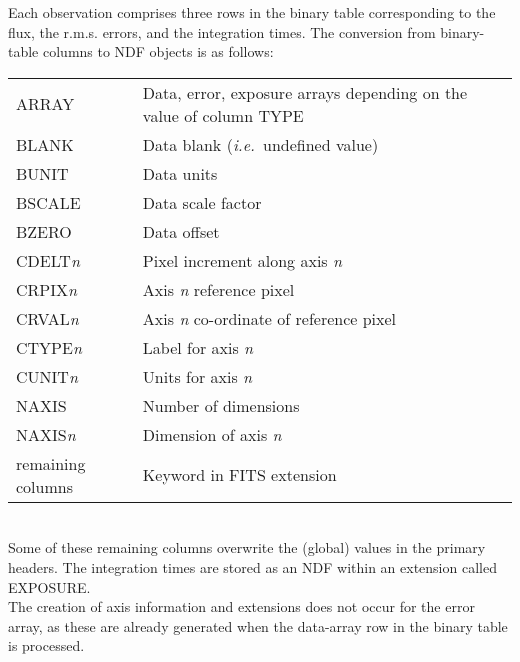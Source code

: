 \documentclass[twoside,11pt]{starlink}
\begin{document}
{{{{            Each observation comprises three rows in the binary table
            corresponding to the flux, the r.m.s. errors, and the integration
            times.
            \sstitem
            The conversion from binary-table columns to NDF objects is as
            follows:
            \\[\medskipamount]
            \begin{tabular}{lp{90mm}}
            ARRAY              &   Data, error, exposure arrays depending
                                   on the value of column TYPE \\
            BLANK              &   Data blank (\textit{i.e.}\ undefined value) \\
            BUNIT              &   Data units \\
            BSCALE             &   Data scale factor \\
            BZERO              &   Data offset \\
            CDELT\textit{n}           &
             Pixel increment along axis \textit{n} \\
            CRPIX\textit{n}           &   Axis \textit{n} reference pixel \\
            CRVAL\textit{n}           &
             Axis \textit{n} co-ordinate of reference pixel \\
            CTYPE\textit{n}           &   Label for axis \textit{n} \\
            CUNIT\textit{n}           &   Units for axis \textit{n} \\
            NAXIS              &   Number of dimensions \\
            NAXIS\textit{n}           &   Dimension of axis \textit{n} \\
            remaining columns  &   Keyword in FITS extension \\
            \end{tabular}
            \\[\medskipamount]
            Some of these remaining columns overwrite the (global) values
            in the primary headers.  The integration times are stored as
            an NDF within an extension called EXPOSURE.
            \\[\medskipamount]
            The creation of axis information and extensions does not occur
            for the error array, as these are already generated when the
            data-array row in the binary table is processed.
            \\[\medskipamount]
}}}}
\end{document}
